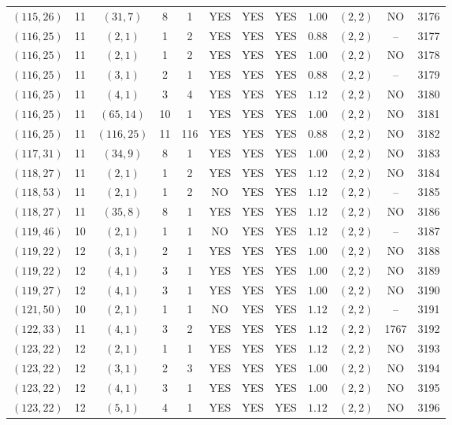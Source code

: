 \begin{longtable}{|c|c|c|c|c|c|c|c|c|c|c|c|}
$(115,26)$ & 11 & $(31,7)$ & 8 & 1 & YES & YES & YES & $1.00$ & $(2,2)$ & NO & 3176\\
$(116,25)$ & 11 & $(2,1)$ & 1 & 2 & YES & YES & YES & $0.88$ & $(2,2)$ & -- & 3177\\
$(116,25)$ & 11 & $(2,1)$ & 1 & 2 & YES & YES & YES & $1.00$ & $(2,2)$ & NO & 3178\\
$(116,25)$ & 11 & $(3,1)$ & 2 & 1 & YES & YES & YES & $0.88$ & $(2,2)$ & -- & 3179\\
$(116,25)$ & 11 & $(4,1)$ & 3 & 4 & YES & YES & YES & $1.12$ & $(2,2)$ & NO & 3180\\
$(116,25)$ & 11 & $(65,14)$ & 10 & 1 & YES & YES & YES & $1.00$ & $(2,2)$ & NO & 3181\\
$(116,25)$ & 11 & $(116,25)$ & 11 & 116 & YES & YES & YES & $0.88$ & $(2,2)$ & NO & 3182\\
$(117,31)$ & 11 & $(34,9)$ & 8 & 1 & YES & YES & YES & $1.00$ & $(2,2)$ & NO & 3183\\
$(118,27)$ & 11 & $(2,1)$ & 1 & 2 & YES & YES & YES & $1.12$ & $(2,2)$ & NO & 3184\\
$(118,53)$ & 11 & $(2,1)$ & 1 & 2 & NO & YES & YES & $1.12$ & $(2,2)$ & -- & 3185\\
$(118,27)$ & 11 & $(35,8)$ & 8 & 1 & YES & YES & YES & $1.12$ & $(2,2)$ & NO & 3186\\
$(119,46)$ & 10 & $(2,1)$ & 1 & 1 & NO & YES & YES & $1.12$ & $(2,2)$ & -- & 3187\\
$(119,22)$ & 12 & $(3,1)$ & 2 & 1 & YES & YES & YES & $1.00$ & $(2,2)$ & NO & 3188\\
$(119,22)$ & 12 & $(4,1)$ & 3 & 1 & YES & YES & YES & $1.00$ & $(2,2)$ & NO & 3189\\
$(119,27)$ & 12 & $(4,1)$ & 3 & 1 & YES & YES & YES & $1.00$ & $(2,2)$ & NO & 3190\\
$(121,50)$ & 10 & $(2,1)$ & 1 & 1 & NO & YES & YES & $1.12$ & $(2,2)$ & -- & 3191\\
$(122,33)$ & 11 & $(4,1)$ & 3 & 2 & YES & YES & YES & $1.12$ & $(2,2)$ & 1767 & 3192\\
$(123,22)$ & 12 & $(2,1)$ & 1 & 1 & YES & YES & YES & $1.12$ & $(2,2)$ & NO & 3193\\
$(123,22)$ & 12 & $(3,1)$ & 2 & 3 & YES & YES & YES & $1.00$ & $(2,2)$ & NO & 3194\\
$(123,22)$ & 12 & $(4,1)$ & 3 & 1 & YES & YES & YES & $1.00$ & $(2,2)$ & NO & 3195\\
$(123,22)$ & 12 & $(5,1)$ & 4 & 1 & YES & YES & YES & $1.12$ & $(2,2)$ & NO & 3196\\

\end{longtable}
